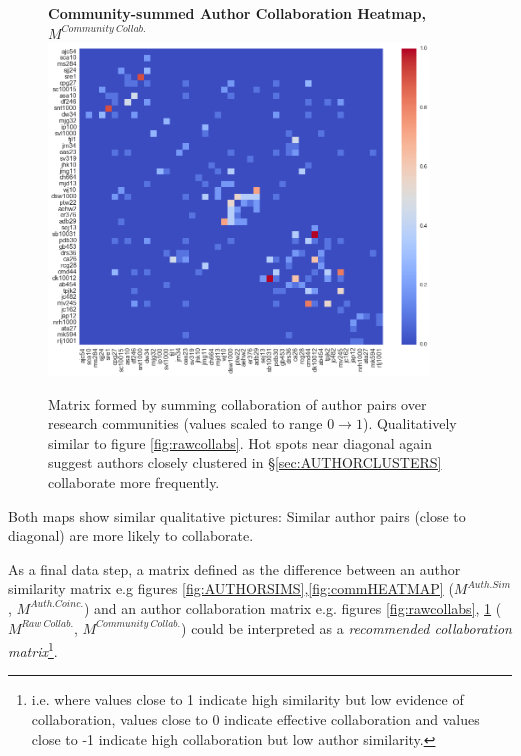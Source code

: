   \begin{figure}[H]
  \centering
  \textbf{Community-summed Author Collaboration Heatmap, $M^{Community\ Collab.}$}
    \includegraphics[width=0.9\textwidth]{Analysis/comm_collabs.png}
    \caption[Community-summed Author Collaboration Heatmap]{Matrix formed by summing collaboration of author pairs over research communities (values scaled to range $0 \rightarrow 1$). Qualitatively similar to figure \ref{fig:rawcollabs}. Hot spots near diagonal again suggest authors closely clustered in \S\ref{sec:AUTHORCLUSTERS} collaborate more frequently.}
      \label{fig:collcollabs}
\end{figure}
Both maps show similar qualitative pictures: Similar author pairs (close to diagonal) are more likely to collaborate. 

As a final data step, a matrix defined as the difference between an author similarity matrix e.g figures \ref{fig:AUTHORSIMS},\ref{fig:commHEATMAP} ($M^{Auth. Sim}$, $M^{Auth. Coinc.}$) and an author collaboration matrix e.g. figures \ref{fig:rawcollabs}, \ref{fig:collcollabs} ($M^{Raw\ Collab.}$, $M^{Community\ Collab.}$) could be interpreted as a \emph{recommended collaboration matrix}\footnote{i.e. where values close to 1 indicate high similarity but low evidence of collaboration, values close to 0 indicate effective collaboration and values close to -1 indicate high collaboration but low author similarity.}.

